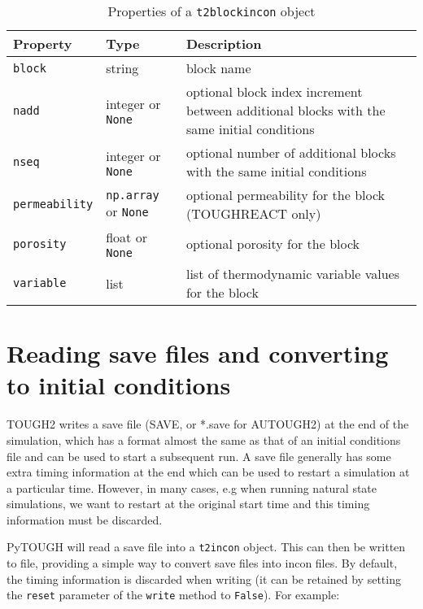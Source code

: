 \begin{table}
  \begin{center}
    \begin{tabular}{|l|l|p{75mm}|}
      \hline
      \textbf{Property} & \textbf{Type} & \textbf{Description}\\
      \hline
      \texttt{block} & string & block name\\
      \texttt{nadd} & integer or \texttt{None} & optional block index increment between additional blocks with the same initial conditions\\
      \texttt{nseq} & integer or \texttt{None} & optional number of additional blocks with the same initial conditions\\
      \texttt{permeability} & \texttt{np.array} or \texttt{None} & optional permeability for the block (TOUGHREACT only)\\
      \texttt{porosity} & float or \texttt{None} & optional porosity for the block\\
      \texttt{variable} & list & list of thermodynamic variable values for the block\\
      \hline
    \end{tabular}
    \caption{Properties of a \texttt{t2blockincon} object}
    \label{tb:t2blockincon_properties}
  \end{center}
\end{table}

\section{Reading save files and converting to initial conditions}

TOUGH2 writes a save file (SAVE, or *.save for AUTOUGH2) at the end of the simulation, which has a format almost the same as that of an initial conditions file and can be used to start a subsequent run.  A save file generally has some extra timing information at the end which can be used to restart a simulation at a particular time.  However, in many cases, e.g when running natural state simulations, we want to restart at the original start time and this timing information must be discarded.

PyTOUGH will read a save file into a \texttt{t2incon} object.  This can then be written to file, providing a simple way to convert save files into incon files.  By default, the timing information is discarded when writing (it can be retained by setting the \texttt{reset} parameter of the \texttt{write} method to \texttt{False}).  For example:

